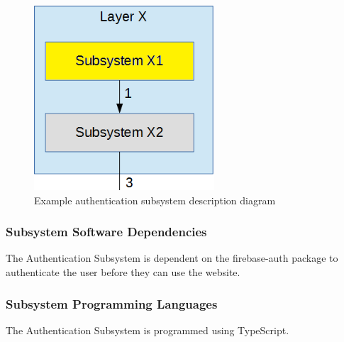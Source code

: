\begin{figure}[h!]
	\centering
	\includegraphics[width=0.60\textwidth]{images/subsystem} %
	\caption{Example authentication subsystem description diagram} %
\end{figure}



\subsubsection{Subsystem Software Dependencies}
The Authentication Subsystem is dependent on the firebase-auth package to authenticate the user before they can use the website.

\subsubsection{Subsystem Programming Languages}
The Authentication Subsystem is programmed using TypeScript.

